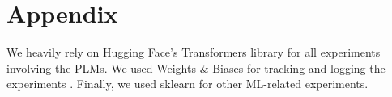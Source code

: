 \section{Appendix}
\label{sec:appendix}

We heavily rely on Hugging Face's Transformers library \cite{wolf-etal-2020-transformers} for all experiments involving the PLMs.
We used Weights \& Biases for tracking and logging the experiments \cite{wandb}.
Finally, we used sklearn \cite{scikit-learn} for other ML-related experiments.

% 

